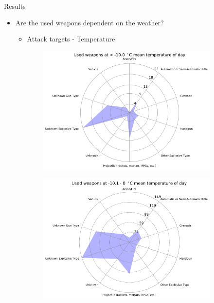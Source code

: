 \documentclass{beamer}
\begin{document}
\begin{frame}{Results}
	\begin{itemize}
		\item 
		Are the used weapons dependent on the weather?
		\begin{itemize}
			\item Attack targets - Temperature
		\end{itemize}
	\end{itemize}
	
	\begin{figure}

		\begin{subfigure}[b]{0.3\textwidth}
			\includegraphics[width=\textwidth]{Temp-Weapon/temp<-100_starDiagram}
		\end{subfigure}
		\begin{subfigure}[b]{0.3\textwidth}
			\includegraphics[width=\textwidth]{Temp-Weapon/temp-101-0_starDiagram}

\end{subfigure}
\end{figure}
\end{frame}
\end{document}
